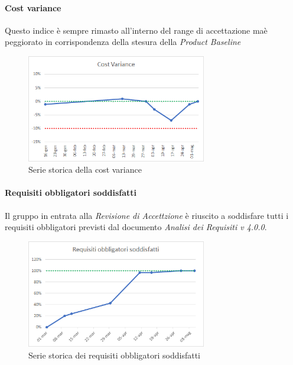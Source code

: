     \paragraph{Cost variance} \Spazio
    Questo indice è sempre rimasto all'interno del range di accettazione maè peggiorato in corrispondenza della stesura della \emph{Product Baseline}
    \begin{figure}[H]
	\centering 
	\includegraphics[width=0.7\textwidth]{Images/CV.png}
	\caption{Serie storica della cost variance}
	\label{CV} 
    \end{figure}
	
    \paragraph{Requisiti obbligatori soddisfatti} \Spazio
    Il gruppo in entrata alla \emph{Revisione di Accettzione} è riuscito a soddisfare tutti i requisiti obbligatori previsti dal documento \textit{Analisi dei Requisiti v 4.0.0}.
    \begin{figure}[H]
    	\centering 
    	\includegraphics[width=0.7\textwidth]{Images/obbl.png}
    	\caption{Serie storica dei requisiti obbligatori soddisfatti}
    	\label{obbl} 
    \end{figure}
